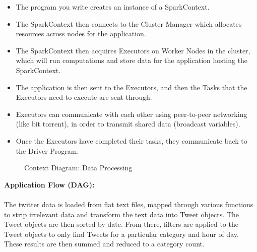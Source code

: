 \documentclass[12pt]{article} %
\begin{document}
	\begin{itemize}
		\item The program you write creates an instance of a SparkContext.
		\item  The SparkContext then connects to the Cluster Manager which allocates resources across nodes for the application.
		\item The SparkContext then acquires Executors on Worker Nodes in the cluster, which will run computations and store data for the application hosting the SparkContext.
		\item The application is then sent to the Executors, and then the Tasks that the Executors need to execute are sent through.
		\item 	Executors can communicate with each other using peer-to-peer networking (like bit torrent), in order to transmit shared data (broadcast variables).
		\item Once the Executors have completed their tasks, they communicate back to the Driver Program.
		
	\end{itemize}	
	
	\begin{figure}[H] %
		\caption{Context Diagram: Data Processing}
		\label{fig:speciation}
	\end{figure}
	

	\textbf{Application Flow (DAG):}
	\\
	\
	\\
	The twitter data is loaded from flat text files, mapped through various functions to strip irrelevant data and transform the text data into Tweet objects. The Tweet objects are then sorted by date. From there, filters are applied to the Tweet objects to only find Tweets for a particular category and hour of day. These results are then summed and reduced to a category count.
	
\end{document}
